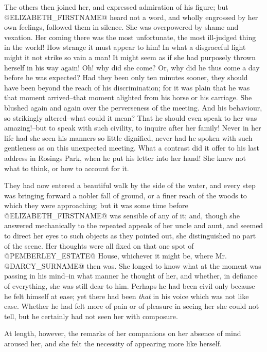 The others then joined her, and expressed admiration of his figure; but
@ELIZABETH_FIRSTNAME@ heard not a word, and wholly engrossed by her own feelings,
followed them in silence. She was overpowered by shame and vexation. Her
coming there was the most unfortunate, the most ill-judged thing in the
world! How strange it must appear to him! In what a disgraceful light
might it not strike so vain a man! It might seem as if she had purposely
thrown herself in his way again! Oh! why did she come? Or, why did he
thus come a day before he was expected? Had they been only ten minutes
sooner, they should have been beyond the reach of his discrimination;
for it was plain that he was that moment arrived--that moment alighted
from his horse or his carriage. She blushed again and again over
the perverseness of the meeting. And his behaviour, so strikingly
altered--what could it mean? That he should even speak to her was
amazing!--but to speak with such civility, to inquire after her family!
Never in her life had she seen his manners so little dignified, never
had he spoken with such gentleness as on this unexpected meeting. What
a contrast did it offer to his last address in Rosings Park, when he put
his letter into her hand! She knew not what to think, or how to account
for it.

They had now entered a beautiful walk by the side of the water, and
every step was bringing forward a nobler fall of ground, or a finer
reach of the woods to which they were approaching; but it was some time
before @ELIZABETH_FIRSTNAME@ was sensible of any of it; and, though she answered
mechanically to the repeated appeals of her uncle and aunt, and
seemed to direct her eyes to such objects as they pointed out, she
distinguished no part of the scene. Her thoughts were all fixed on that
one spot of @PEMBERLEY_ESTATE@ House, whichever it might be, where Mr. @DARCY_SURNAME@ then
was. She longed to know what at the moment was passing in his mind--in
what manner he thought of her, and whether, in defiance of everything,
she was still dear to him. Perhaps he had been civil only because he
felt himself at ease; yet there had been \textit{that} in his voice which was
not like ease. Whether he had felt more of pain or of pleasure in
seeing her she could not tell, but he certainly had not seen her with
composure.

At length, however, the remarks of her companions on her absence of mind
aroused her, and she felt the necessity of appearing more like herself.

